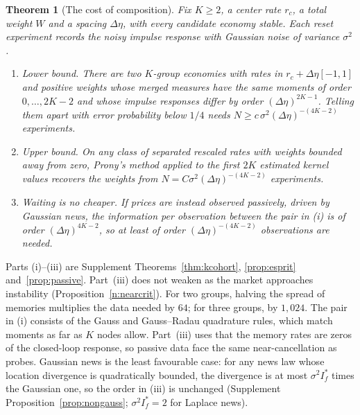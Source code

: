 \documentclass[12pt]{article}
\newtheorem{theorem}{Theorem}[section]
\theoremstyle{definition}
\theoremstyle{remark}
\begin{document}
\begin{theorem}[The cost of composition]\label{n:cost}
Fix $K\ge2$, a center rate $r_c$, a total weight $W$ and a spacing $\Delta\eta$, with every candidate economy stable. Each reset experiment records the noisy impulse response with Gaussian noise of variance $\sigma^2$.
\begin{enumerate}[label=(\roman*),itemsep=1pt]
\item \emph{Lower bound.} There are two $K$-group economies with rates in $r_c+\Delta\eta[-1,1]$ and positive weights whose merged measures have the same moments of order $0,\ldots,2K-2$ and whose impulse responses differ by order $(\Delta\eta)^{2K-1}$. Telling them apart with error probability below $1/4$ needs $N\ge c\,\sigma^2(\Delta\eta)^{-(4K-2)}$ experiments.
\item \emph{Upper bound.} On any class of separated rescaled rates with weights bounded away from zero, Prony's method applied to the first $2K$ estimated kernel values recovers the weights from $N=C\sigma^2(\Delta\eta)^{-(4K-2)}$ experiments.
\item \emph{Waiting is no cheaper.} If prices are instead observed passively, driven by Gaussian news, the information per observation between the pair in (i) is of order $(\Delta\eta)^{4K-2}$, so at least of order $(\Delta\eta)^{-(4K-2)}$ observations are needed.
\end{enumerate}
\end{theorem}

Parts (i)--(iii) are Supplement Theorems~\ref{thm:kcohort}, \ref{prop:esprit} and~\ref{prop:passive}. Part~(iii) does not weaken as the market approaches instability (Proposition~\ref{n:nearcrit}). For two groups, halving the spread of memories multiplies the data needed by $64$; for three groups, by $1{,}024$. The pair in (i) consists of the Gauss and Gauss--Radau quadrature rules, which match moments as far as $K$ nodes allow. Part~(iii) uses that the memory rates are zeros of the closed-loop response, so passive data face the same near-cancellation as probes. Gaussian news is the least favourable case: for any news law whose location divergence is quadratically bounded, the divergence is at most $\sigma^2I^*_f$ times the Gaussian one, so the order in (iii) is unchanged (Supplement Proposition~\ref{prop:nongauss}; $\sigma^2I^*_f=2$ for Laplace news).
\end{document}
